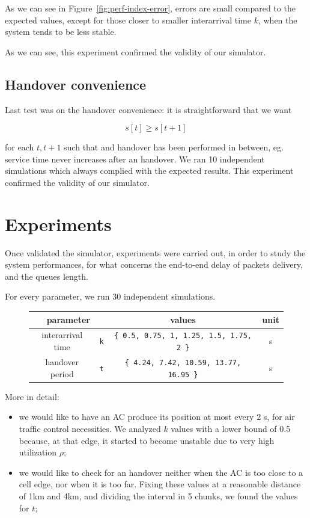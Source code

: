 \documentclass[a4paper,12pt]{article}
\begin{document}
As we can see in Figure~\ref{fig:perf-index-error}, errors are small compared to the expected values, except for those closer to smaller interarrival time $k$, when the system tends to be less stable.

As we can see, this experiment confirmed the validity of our simulator.

\subsection{Handover convenience}
\label{sec:handover-convenience}
Last test was on the handover convenience: it is straightforward that we want

$$ s[t] \geq s[t + 1] $$

for each $t, t + 1$ such that and handover has been performed in between, eg. service time never increases after an handover. We ran 10 independent simulations which always complied with the expected results.
This experiment confirmed the validity of our simulator.

\section{Experiments}
Once validated the simulator, experiments were carried out, in order to study the system performances, for what concerns the end-to-end delay of packets delivery, and the queues length.

For every parameter, we run 30 independent simulations.

\begin{figure}[H]
  \centering
  \begin{tabular}{| c | c | c | c |}\hline
    \multicolumn{2}{|c|}{parameter} & values & unit \\ \hline
    interarrival time & \texttt{k} & \texttt{\{ 0.5, 0.75, 1, 1.25, 1.5, 1.75, 2 \}} & s \\ \hline
    handover period & \texttt{t} & \texttt{\{ 4.24, 7.42, 10.59, 13.77, 16.95 \}} & s \\ \hline
  \end{tabular}
\end{figure}

More in detail:
\begin{itemize}
  \item we would like to have an AC produce its position at most every 2 s, for air traffic control necessities.
  We analyzed $k$ values with a lower bound of 0.5 because, at that edge, it started to become unstable due to very high utilization $\rho$;
  \item we would like to check for an handover neither when the AC is too close to a cell edge, nor when it is too far.
  Fixing these values at a reasonable distance of 1km and 4km, and dividing the interval in 5 chunks, we found the values for $t$;
\end{itemize}
\end{document}
